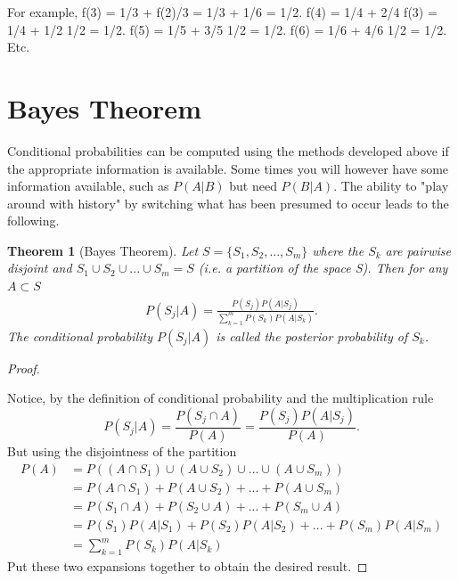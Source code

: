 \documentclass[10pt,]{book}
\theoremstyle{plain}
\newtheorem{theorem}{Theorem}[section]
\theoremstyle{definition}
\theoremstyle{definition}
\theoremstyle{definition}
\numberwithin{equation}{section}
\begin{document}
	For example,
	f(3) = 1/3 + f(2)/3 = 1/3 + 1/6 = 1/2.   
	f(4) = 1/4 + 2/4 f(3) = 1/4 + 1/2 1/2 = 1/2.
	f(5) = 1/5 + 3/5 1/2 = 1/2.
	f(6) = 1/6 + 4/6 1/2 = 1/2. Etc.
	

\typeout{************************************************}
\typeout{************************************************}
\section[{Bayes Theorem}]{Bayes Theorem}\label{section-20}
\typeout{************************************************}
\typeout{************************************************}
Conditional probabilities can be computed using the methods developed above if the appropriate information is available. Some times you will however have some information available, such as \(P(A | B)\) but need \(P(B | A)\). The ability to "play around with history" by switching what has been presumed to occur leads to the following.
\begin{theorem}[{Bayes Theorem}]\label{theorem-25}
Let \(S = \{ S_1, S_2, ... , S_m \}\) where the \(S_k\) are pairwise disjoint and \(S_1 \cup S_2 \cup ... \cup S_m = S\) (i.e. a partition of the space S).  Then for any \(A \subset S\)\begin{gather*}
P(S_j | A) = \frac{P(S_j)P(A | S_j)}{\sum_{k=1}^m P(S_k)P(A | S_k)}.
\end{gather*}
		The conditional probability \(P(S_j | A)\) is called the posterior probability of \(S_k\).
		\end{theorem}
\begin{proof}\hypertarget{proof-20}{}

		Notice, by the definition of conditional probability and the multiplication rule
		\begin{equation*}P(S_j | A) = \frac{P(S_j \cap A)}{P(A)} = \frac{P(S_j)P( A | S_j)}{P(A)}.\end{equation*}
		But using the disjointness of the partition 
		\begin{align*}
P(A) & = P( (A \cap S_1) \cup (A \cup S_2) \cup ... \cup (A \cup S_m) )\\
    & = P(A \cap S_1) + P(A \cup S_2) + ... + P(A \cup S_m)\\
    & = P(S_1 \cap A) + P(S_2 \cup A) + ... + P(S_m \cup A)\\
    & = P(S_1) P(A | S_1) + P(S_2)P(A | S_2) + ... + P(S_m)P(A | S_m)\\
    & = \sum_{k=1}^m P(S_k)P(A | S_k)
\end{align*}
		Put these two expansions together to obtain the desired result.
\end{proof}
\end{document}

